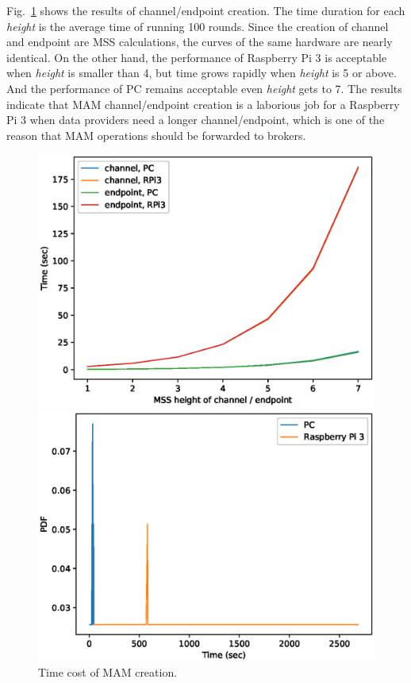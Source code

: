 \documentclass[conference]{IEEEtran}
\begin{document}
Fig.~\ref{fig:mam_create} shows the results of channel/endpoint creation. The time duration for each \textit{height} is the average time of running 100 rounds. Since the creation of channel and endpoint are MSS calculations, the curves of the same hardware are nearly identical. On the other hand, the performance of Raspberry Pi 3 is acceptable when \textit{height} is smaller than 4, but time grows rapidly when \textit{height} is 5 or above. And the performance of PC remains acceptable even \textit{height} gets to 7. The results indicate that MAM channel/endpoint creation is a laborious job for a Raspberry Pi 3 when data providers need a longer channel/endpoint, which is one of the reason that MAM operations should be forwarded to brokers.
\begin{figure}[!htb]
  \includegraphics[width=\linewidth]{mam_create}
  \caption{Time cost of MAM creation.}\label{fig:mam_create}
\endminipage\hfill
{}
  \includegraphics[width=\linewidth]{mam_send}

\end{figure}
\end{document}
